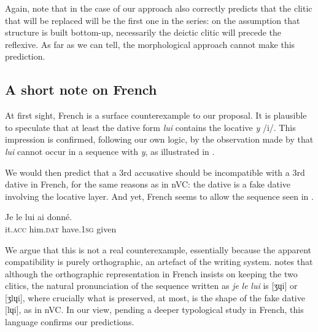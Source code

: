 \documentclass[output=paper,modfonts,nonflat,newtxmath,colorlinks,citecolor=brown]{langsci/langscibook}
\begin{document}
\z


Again, note that in the case of  our approach also correctly predicts that the clitic that will be replaced will be the first one in the series: on the assumption that structure is built bottom-up, necessarily the deictic clitic will precede the reflexive. As far as we can tell, the morphological approach cannot make this prediction.

\subsection{A short note on French} %
\label{sec:cabre:3.3}

At first sight, French is a surface counterexample to our proposal. It is plausible to speculate that at least the dative form \textit{lui} contains the locative \textit{y} /i/. This impression is confirmed, following our own logic, by the observation made by \citet{Rezac2010} that \textit{lui} cannot occur in a sequence with \textit{y}, as illustrated in .

 \z

We would then predict that a 3rd accusative should be incompatible with a 3rd dative in French, for the same reasons as in nVC: the dative is a fake dative involving the locative layer. And yet, French seems to allow the sequence seen in . 

\ea%
    \label{ex:cabre:30}
    \gll Je le     lui    ai     donné.\\
          it.\textsc{acc} him.\textsc{dat}   have.\textsc{1sg} given\\
    \glt 
    \z

We argue that this is not a real counterexample, essentially because the apparent compatibility is purely orthographic, an artefact of the writing system. \citet{Schwarze2001} notes that although the orthographic representation in French insists on keeping the two clitics, the natural pronunciation of the sequence written as \textit{je} \textit{le} \textit{lui} is [ʒɥi] or [ʒlɥi], where crucially what is preserved, at most, is the shape of the fake dative [lɥi], as in nVC. In our view, pending a deeper typological study in French, this language confirms our predictions. 
\end{document}
